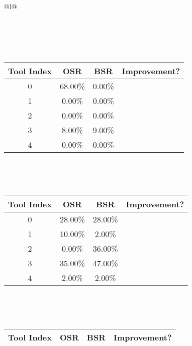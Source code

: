 \begin{longtable}{@{}l@{}}
\begin{minipage}{\textwidth}
\begin{tabular}{|c|c|c|c|}
\end{tabular}
\end{minipage}\\[2ex]
\begin{minipage}{\textwidth}
\centering\vspace{2ex}
\\[0.8ex]
\begin{tabular}{|c|c|c|c|} \hline
\textbf{Tool Index} & \textbf{OSR} & \textbf{ BSR} & \textbf{Improvement?} \\ \hline
0 & 68.00\% & 0.00\% & \textcolor{red}{\ding{55}} \\ \hline
1 & 0.00\% & 0.00\% & \textcolor{red}{\ding{55}} \\ \hline
2 & 0.00\% & 0.00\% & \textcolor{red}{\ding{55}} \\ \hline
3 & 8.00\% & 9.00\% & \textcolor{green}{\ding{51}} \\ \hline
4 & 0.00\% & 0.00\% & \textcolor{red}{\ding{55}} \\ \hline
\end{tabular}
\end{minipage}\\[2ex]
\begin{minipage}{\textwidth}
\centering\vspace{2ex}
\\[0.8ex]
\begin{tabular}{|c|c|c|c|} \hline
\textbf{Tool Index} & \textbf{OSR} & \textbf{ BSR} & \textbf{Improvement?} \\ \hline
0 & 28.00\% & 28.00\% & \textcolor{red}{\ding{55}} \\ \hline
1 & 10.00\% & 2.00\% & \textcolor{red}{\ding{55}} \\ \hline
2 & 0.00\% & 36.00\% & \textcolor{green}{\ding{51}} \\ \hline
3 & 35.00\% & 47.00\% & \textcolor{green}{\ding{51}} \\ \hline
4 & 2.00\% & 2.00\% & \textcolor{red}{\ding{55}} \\ \hline
\end{tabular}
\end{minipage}\\[2ex]
\begin{minipage}{\textwidth}
\centering\vspace{2ex}
\\[0.8ex]
\begin{tabular}{|c|c|c|c|} \hline
\textbf{Tool Index} & \textbf{OSR} & \textbf{ BSR} & \textbf{Improvement?} \\ \hline

\end{tabular}
\end{minipage}
\end{longtable}
